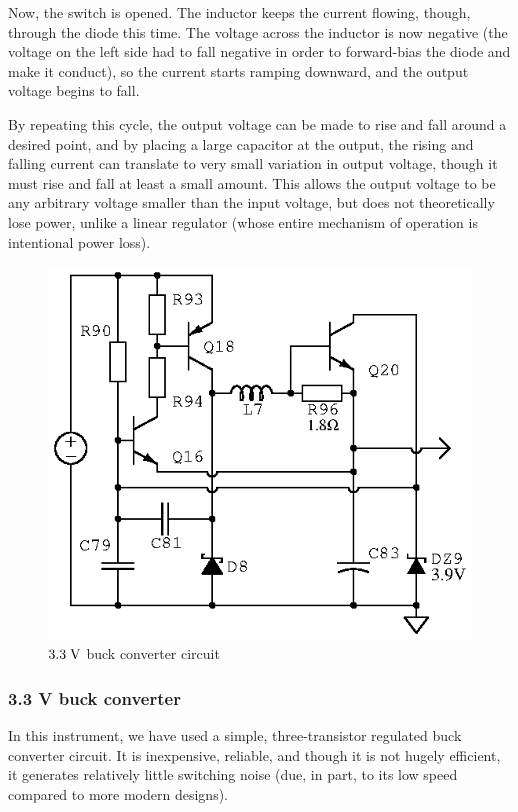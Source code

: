 Now, the switch is opened. The inductor keeps the current flowing, though,
through the diode this time. The voltage across the inductor is now negative
(the voltage on the left side had to fall negative in order to forward-bias the
diode and make it conduct), so the current starts ramping downward, and the
output voltage begins to fall.~\cite[pp.~356--357]{aoe-vreg}

By repeating this cycle, the output voltage can be made to rise and fall around
a desired point, and by placing a large capacitor at the output, the rising and
falling current can translate to very small variation in output voltage, though
it must rise and fall at least a small amount. This allows the output voltage
to be any arbitrary voltage smaller than the input voltage, but does not
theoretically lose power, unlike a linear regulator (whose entire mechanism of
operation is intentional power loss).


\begin{figure}[H]
\centering
\includegraphics[]{3v3buck}
\caption{$3.3\;\mathrm{V}$ buck converter circuit}
\label{fig:3v3buck}
\end{figure}

\subsubsection{3.3 V buck converter}

In this instrument, we have used a simple, three-transistor regulated buck
converter circuit. It is inexpensive, reliable, and though it is not hugely
efficient, it generates relatively little switching noise (due, in part, to
its low speed compared to more modern designs).

